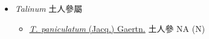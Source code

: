 
  \begin{itemize}
 \item[] \textit{Talinum} 土人參屬
                                
  \begin{itemize}
        \item[] \href{http://www.theplantlist.org/tpl1.1/search?q=Talinum+paniculatum}{\textit{T. paniculatum} (Jacq.) Gaertn.}   土人參   NA (N)
  \end{itemize}
  \end{itemize}
